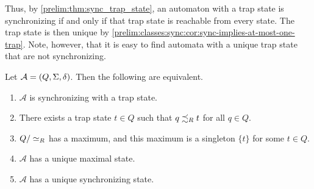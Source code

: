 Thus, by \cref{prelim:thm:sync_trap_state}, an automaton with a trap state is
synchronizing if and only if that trap state is reachable from every state. The
trap state is then unique by
\cref{prelim:classes:sync:cor:sync-implies-at-most-one-trap}. Note, however,
that it is easy to find automata with a unique trap state that are not
synchronizing.


\begin{corollary} \label{prelim:cor:sync_trap_state}
	\label{prelim:classes:sync:cor:sync-trap-state}
Let $\mathcal A = (Q, \Sigma, \delta)$. Then the following are equivalent.
\begin{enumerate}
\item \label{prelim:cor:sync_trap_state:item:sync} $\mathcal A$ is synchronizing with a trap state.
	
\item \label{prelim:cor:sync_trap_state:item:trapreach} There exists a trap state $t \in Q$ such that $q \precsim_R t$ for all $q \in Q$.

\item \label{prelim:cor:sync_trap_state:item:uniquemaxclass} $Q / \simeq_R$ has a maximum, and this maximum is a singleton $\{t\}$ for some $t \in Q$.

\item  \label{prelim:cor:sync_trap_state:item:uniquemax} $\mathcal A$ has a unique maximal state.

\item \label{prelim:cor:sync_trap_state:item:uniquesync} $\mathcal A$ has a unique synchronizing state.
\end{enumerate}
\end{corollary}
